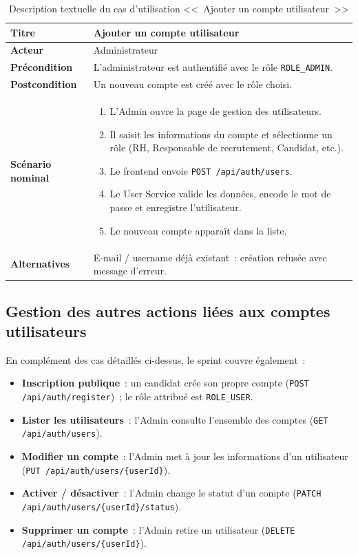 \begin{table}[htbp]
  \centering
  \small
  \caption{Description textuelle du cas d'utilisation <<~Ajouter un compte utilisateur~>>}
  \label{tab:uc-add-user}
  \begin{tabular}{|p{3.0cm}|p{10.2cm}|}
    \hline
    \textbf{Titre} & Ajouter un compte utilisateur \\
    \hline
    \textbf{Acteur} & Administrateur \\
    \hline
    \textbf{Précondition} & L'administrateur est authentifié avec le rôle \texttt{ROLE\_ADMIN}. \\
    \hline
    \textbf{Postcondition} & Un nouveau compte est créé avec le rôle choisi. \\
    \hline
    \textbf{Scénario nominal}
    &
    \begin{enumerate}[leftmargin=*,itemsep=0.15em,topsep=0.2em]
      \item L'Admin ouvre la page de gestion des utilisateurs.
      \item Il saisit les informations du compte et sélectionne un rôle
            (RH, Responsable de recrutement, Candidat, etc.).
      \item Le frontend envoie \texttt{POST /api/auth/users}.
      \item Le User Service valide les données, encode le mot de passe et enregistre l'utilisateur.
      \item Le nouveau compte apparaît dans la liste.
    \end{enumerate}
    \\
    \hline
    \textbf{Alternatives}
    & E-mail / username déjà existant~: création refusée avec message d'erreur. \\
    \hline
  \end{tabular}
\end{table}


\subsection{Gestion des autres actions liées aux comptes utilisateurs}

En complément des cas détaillés ci-dessus, le sprint couvre également~:
\begin{itemize}
  \item \textbf{Inscription publique}~: un candidat crée son propre compte
        (\texttt{POST /api/auth/register})~; le rôle attribué est
        \texttt{ROLE\_USER}.
  \item \textbf{Lister les utilisateurs}~: l'Admin consulte l'ensemble des
        comptes (\texttt{GET /api/auth/users}).
  \item \textbf{Modifier un compte}~: l'Admin met à jour les informations
        d'un utilisateur (\texttt{PUT /api/auth/users/\{userId\}}).
  \item \textbf{Activer / désactiver}~: l'Admin change le statut d'un compte
        (\texttt{PATCH /api/auth/users/\{userId\}/status}).
  \item \textbf{Supprimer un compte}~: l'Admin retire un utilisateur
        (\texttt{DELETE /api/auth/users/\{userId\}}).
\end{itemize}


